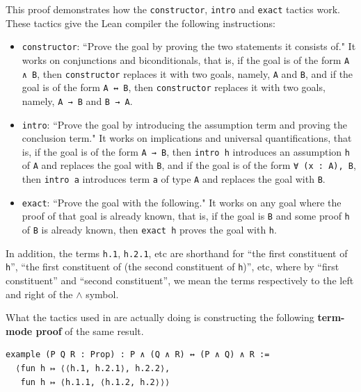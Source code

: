 This proof demonstrates how the \lstinline|constructor|, \lstinline|intro| and \lstinline|exact| tactics work. These tactics give the Lean compiler the following instructions:
\begin{itemize}
    \item \lstinline|constructor|: ``Prove the goal by proving the two statements it consists of." It works on conjunctions and biconditionals, that is, if the goal is of the form \lstinline|A ∧ B|, then \lstinline|constructor| replaces it with two goals, namely, \lstinline|A| and \lstinline|B|, and if the goal is of the form \lstinline|A ↔ B|, then \lstinline|constructor| replaces it with two goals, namely, \lstinline|A → B| and \lstinline|B → A|.
    
    \item \lstinline|intro|: ``Prove the goal by introducing the assumption term and proving the conclusion term." It works on implications and universal quantifications, that is, if the goal is of the form \lstinline|A → B|, then \lstinline|intro h| introduces an assumption \lstinline|h| of \lstinline|A| and replaces the goal with \lstinline|B|, and if the goal is of the form \lstinline|∀ (x : A), B|, then \lstinline|intro a| introduces term \lstinline|a| of type \lstinline|A| and replaces the goal with \lstinline|B|.

    \item \lstinline|exact|: ``Prove the goal with the following." It works on any goal where the proof of that goal is already known, that is, if the goal is \verb|B| and some proof \lstinline|h| of \lstinline|B| is already known, then \lstinline|exact h| proves the goal with \lstinline|h|.
\end{itemize}

In addition, the terms \lstinline|h.1|, \lstinline|h.2.1|, etc are shorthand for ``the first constituent of \lstinline|h|'', ``the first constituent of (the second constituent of \lstinline|h|)'', etc, where by ``first constituent'' and ``second constituent'', we mean the terms respectively to the left and right of the $\land$ symbol.

What the tactics used in  are actually doing is constructing the following \textbf{term-mode proof} of the same result.

\begin{lstlisting}[caption=A term-mode proof of the associativity of $\land$, label=Ch5:Listing:And_assoc_term]
example (P Q R : Prop) : P ∧ (Q ∧ R) ↔ (P ∧ Q) ∧ R :=
  ⟨fun h ↦ ⟨⟨h.1, h.2.1⟩, h.2.2⟩,
   fun h ↦ ⟨h.1.1, ⟨h.1.2, h.2⟩⟩⟩
\end{lstlisting}

